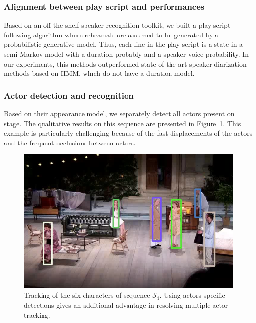 \documentclass[conference]{IEEEtran}
\begin{document}
\subsubsection{Alignment between play script and performances}

Based on an off-the-shelf speaker recognition toolkit, we built a play script following algorithm where rehearsals 
are assumed to be generated by a probabilistic generative model.  Thus, each  line in the play script is a state 
in a semi-Markov model with a duration probably and a speaker voice probability. In our experiments, this methods
outperformed state-of-the-art speaker diarization methods based on HMM, which do not have a duration model.



\subsubsection{Actor detection and recognition} 

Based on their appearance model, we separately detect all actors present on stage. The qualitative results on this sequence 
are presented in Figure~\ref{fig_tracking_coahtr}. This example is particularly challenging  because of the fast displacements 
of the actors and the frequent occlusions between actors. 

\begin{figure}[tp]
\centering
\includegraphics[width=\columnwidth]{tracking_coahtr}
\caption{Tracking of  the six characters of sequence $\mathcal{S}_4$. Using actors-specific detections gives 
an additional advantage in resolving multiple actor tracking.}
\label{fig_tracking_coahtr}
\end{figure}
\end{document}
